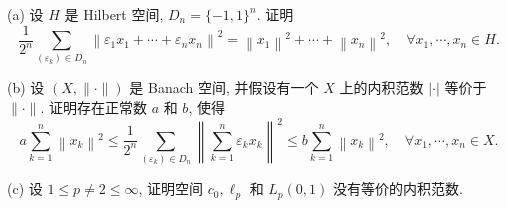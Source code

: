 \begin{exercise}
    (a) 设 $H$ 是 Hilbert 空间, $D_{n}=\{-1,1\}^{n}$. 证明
    \[
    \frac{1}{2^{n}} \sum_{(\varepsilon_{k}) \in D_{n}}\left\|\varepsilon_{1} x_{1}+\cdots+\varepsilon_{n} x_{n}\right\|^{2}=\left\|x_{1}\right\|^{2}+\cdots+\left\|x_{n}\right\|^{2}, \quad \forall x_1,\cdots,x_n \in H.
    \]

    (b) 设 $(X,\|\cdot\|)$ 是 Banach 空间, 并假设有一个 $X$ 上的内积范数 $|\cdot|$ 
    等价于 $\|\cdot\|$. 证明存在正常数 $a$ 和 $b$, 使得
    \[
    a\sum_{k=1}^{n}\left\|x_{k}\right\|^{2}\leq\frac{1}{2^{n}} \sum_{\left(\varepsilon_{k}\right) \in D_{n}}\left\|\sum_{k=1}^{n} \varepsilon_{k} x_{k}\right\|^{2} \leq b \sum_{k=1}^{n}\left\|x_{k}\right\|^{2}, \quad \forall x_{1}, \cdots, x_{n} \in X.
    \]

    (c) 设 $1 \leq p \neq 2 \leq \infty$, 证明空间 $c_{0}, \ell_{p}$ 和 $L_{p}(0,1)$ 没有等价的内积范数.
\end{exercise}

